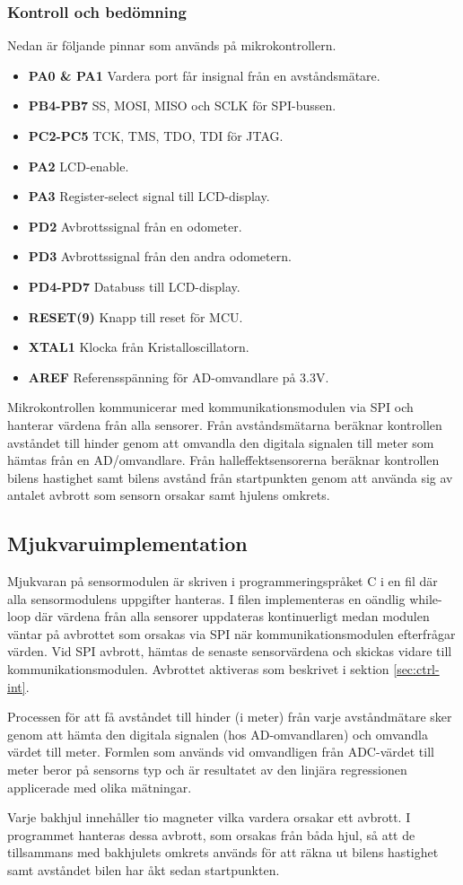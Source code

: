 \documentclass[tekniskrapport/tech.tex]{subfiles}
\begin{document}
\subsubsection{Kontroll och bedömning}
Nedan är följande pinnar som används på mikrokontrollern.
\begin{itemize}
   \item \textbf{PA0 \& PA1} Vardera port får insignal från en avståndsmätare.
   \item \textbf{PB4-PB7} SS, MOSI, MISO och SCLK för SPI-bussen.
   \item \textbf{PC2-PC5} TCK, TMS, TDO, TDI för JTAG.
   \item \textbf{PA2} LCD-enable.
   \item \textbf{PA3} Register-select signal till LCD-display.
   \item \textbf{PD2} Avbrottssignal från en odometer.
   \item \textbf{PD3} Avbrottssignal från den andra odometern.
   \item \textbf{PD4-PD7} Databuss till LCD-display.
   \item \textbf{RESET(9)} Knapp till reset för MCU.
   \item \textbf{XTAL1} Klocka från Kristalloscillatorn. 
   \item \textbf{AREF} Referensspänning för AD-omvandlare på 3.3V.

\end{itemize}
Mikrokontrollen kommunicerar med kommunikationsmodulen via SPI och hanterar
värdena från alla sensorer. Från avståndsmätarna beräknar kontrollen avståndet
till hinder genom att omvandla den digitala signalen till meter som hämtas från
en AD/omvandlare. Från halleffektsensorerna beräknar kontrollen bilens
hastighet samt bilens avstånd från startpunkten genom att använda sig av
antalet avbrott som sensorn orsakar samt hjulens omkrets.

\subsection{Mjukvaruimplementation} 
Mjukvaran på sensormodulen är skriven i programmeringspråket C i en fil där
alla sensormodulens uppgifter hanteras. I filen implementeras en oändlig
while-loop där värdena från alla sensorer uppdateras kontinuerligt medan
modulen väntar på avbrottet som orsakas via SPI när kommunikationsmodulen
efterfrågar värden. Vid SPI avbrott, hämtas de senaste sensorvärdena och
skickas vidare till kommunikationsmodulen. Avbrottet aktiveras som beskrivet i
sektion \ref{sec:ctrl-int}.

Processen för att få avståndet till hinder (i meter) från varje avståndmätare
sker genom att hämta den digitala signalen (hos AD-omvandlaren) och omvandla
värdet till meter. Formlen som används vid omvandligen från ADC-värdet till
meter beror på sensorns typ och är resultatet av den linjära regressionen
applicerade med olika mätningar.

Varje bakhjul innehåller tio magneter vilka vardera orsakar ett avbrott. I
programmet hanteras dessa avbrott, som orsakas från båda hjul, så att de
tillsammans med bakhjulets omkrets används för att räkna ut bilens hastighet
samt avståndet bilen har åkt sedan startpunkten.
\end{document}
